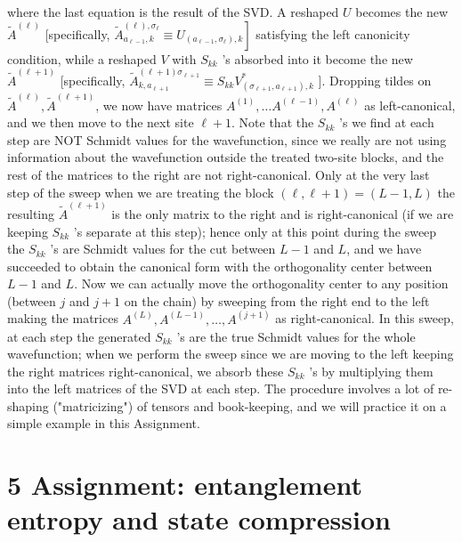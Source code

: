\documentclass[12pt]{article}
\begin{document}
where the last equation is the result of the SVD. A reshaped $U$ becomes the new $\tilde{A}^{(\ell)}$ [specifically, $\left.\tilde{A}_{a_{\ell-1}, k}^{(\ell), \sigma_{\ell}} \equiv U_{\left(a_{\ell-1}, \sigma_{\ell}\right), k}\right]$ satisfying the left canonicity condition, while a reshaped $V$ with $S_{k k}$ 's absorbed into it become the new $\tilde{A}^{(\ell+1)}$ [specifically, $\tilde{A}_{k, a_{\ell+1}}^{(\ell+1) \sigma_{\ell+1}} \equiv S_{k k} V_{\left(\sigma_{\ell+1}, a_{\ell+1}\right), k}^{*}$ ]. Dropping tildes on $\tilde{A}^{(\ell)}, \tilde{A}^{(\ell+1)}$, we now have matrices $A^{(1)}, \ldots A^{(\ell-1)}, A^{(\ell)}$ as left-canonical, and we then move to the next site $\ell+1$. Note that the $S_{k k}$ 's we find at each step are NOT Schmidt values for the wavefunction, since we really are not using information about the wavefunction outside the treated two-site blocks, and the rest of the matrices to the right are not right-canonical. Only at the very last step of the sweep when we are treating the block $(\ell, \ell+1)=(L-1, L)$ the resulting $\tilde{A}^{(\ell+1)}$ is the only matrix to the right and is right-canonical (if we are keeping $S_{k k}$ 's separate at this step); hence only at this point during the sweep the $S_{k k}$ 's are Schmidt values for the cut between $L-1$ and $L$, and we have succeeded to obtain the canonical form with the orthogonality center between $L-1$ and $L$. Now we can actually move the orthogonality center to any position (between $j$ and $j+1$ on the chain) by sweeping from the right end to the left making the matrices $A^{(L)}, A^{(L-1)}, \ldots, A^{(j+1)}$ as right-canonical. In this sweep, at each step the generated $S_{k k}$ 's are the true Schmidt values for the whole wavefunction; when we perform the sweep since we are moving to the left keeping the right matrices right-canonical, we absorb these $S_{k k}$ 's by multiplying them into the left matrices of the SVD at each step. The procedure involves a lot of re-shaping ("matricizing") of tensors and book-keeping, and we will practice it on a simple example in this Assignment.

\section*{5 Assignment: entanglement entropy and state compression}
\end{document}
